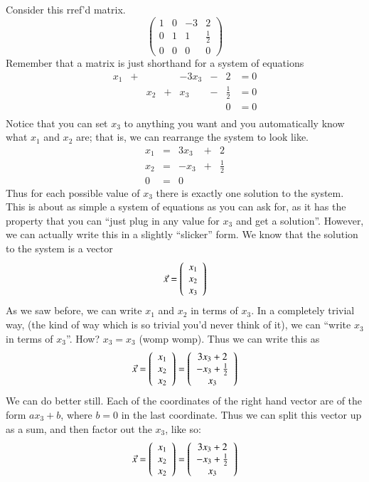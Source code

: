 \documentclass[Main.tex]{subfiles}
\begin{document}
\begin{Example}
  \label{sec:gaussexamp}
  Consider this rref'd matrix.
  \[\left(\begin{array}{cccc}
      1 & 0 & -3 &  2\\
      0 & 1 & 1  &  \frac{1}{2}\\
      0 & 0 & 0 & 0
    \end{array}\right)\]
  Remember that a matrix is just shorthand for a system of equations
  \[\begin{array}{cccccccc}
    x_1 & + & & & -3x_3 & - &  2 & = 0\\
    & & x_2& + & x_3 & - &  \frac{1}{2} & = 0\\
    & & & &&  &  0 & = 0\\
  \end{array}\]
  Notice that you can set $x_3$ to anything you want and you automatically know what $x_1$ and $x_2$ are; that is, we can rearrange the system to look like.
  \[\begin{array}{cccccccc}
    x_1 & = & 3x_3 & + &  2\\
    x_2& = & -x_3 & + &  \frac{1}{2}\\
    0 &=&0
  \end{array}\]
  Thus for each possible value of $x_3$ there is exactly one solution to the system.  
  This is about as simple a system of equations as you can ask for, as it has the property that you can ``just plug in any value for $x_3$ and get a solution''.  
  However, we can actually write this in a slightly ``slicker'' form.
  We know that the solution to the system is a vector 
  \[\vec{x}=\left(\begin{array}{c}x_1 \\ x_2 \\ x_3\end{array}\right)\]
  As we saw before, we can write $x_1$ and $x_2$ in terms of $x_3$.  
  In a completely trivial way, (the kind of way which is so trivial you'd never think of it), we can ``write $x_3$ in terms of $x_3$''.  
  How?  $x_3=x_3$ (womp womp).  
  Thus we can write this as
  \[\vec{x}=\left(\begin{array}{c}x_1 \\ x_2 \\ x_2\end{array}\right)= \left(\begin{array}{c}3x_3+2 \\ -x_3+\frac{1}{2} \\ x_3\end{array}\right)\]
  We can do better still.  
  Each of the coordinates of the right hand vector are of the form $ax_3+b$, where $b=0$ in the last coordinate.  
  Thus we can split this vector up as a sum, and then factor out the $x_3$, like so:
  \[\vec{x}=\left(\begin{array}{c}x_1 \\ x_2 \\ x_2\end{array}\right)= \left(\begin{array}{c}3x_3+2 \\ -x_3+\frac{1}{2} \\ x_3\end{array}\right)
\]
\end{Example}
\end{document}
